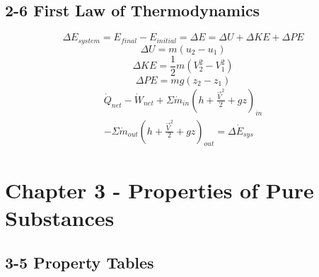 \documentclass[10pt,landscape]{article}
\begin{document}
\begin{multicols}{3}
\subsection{2-6 First Law of Thermodynamics}
\begin{equation}
    \Delta E_{system}=E_{final}-E_{initial}=\Delta E=\Delta U + \Delta KE + \Delta PE
\end{equation}
\begin{equation}
    \Delta U = m(u_2-u_1)
\end{equation}
\begin{equation}
    \Delta KE=\frac{1}{2}m(V_2^2-V_1^2)
\end{equation}
\begin{equation}
    \Delta PE=mg(z_2-z_1)
\end{equation}
\begin{equation}
    \begin{aligned}
        \dot{Q}_{net}-\dot{W}_{net}+\Sigma\dot{m}_{in}(h+\frac{\vec{V}^2}{2}+gz)_{in}\\
        -\Sigma\dot{m}_{out}(h+\frac{\vec{V}^2}{2}+gz)_{out}=\Delta\dot{E}_{sys}
    \end{aligned}
\end{equation}

\section{Chapter 3 - Properties of Pure Substances}
\subsection{3-5 Property Tables}

\end{multicols}
\end{document}
